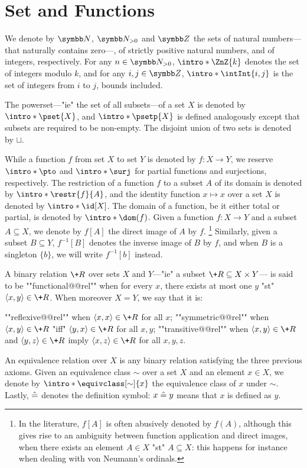\section{Set and Functions}

We denote by $\N$, $\Np$ and $\Z$ the sets of natural numbers---that naturally contains zero---,
of strictly positive natural numbers, and of integers, respectively.
For any $n\in\Np$, \AP$\intro*\ZnZ{k}$ denotes the set of integers modulo $k$,
and for any $i,j \in \Z$, $\intro*\intInt{i,j}$ is the set of integers from $i$ to $j$,
bounds included.

The powerset---"ie" the set of all subsets---of a set $X$
is denoted by $\intro*\pset{X}$, and $\intro*\psetp{X}$ is defined analogously
except that subsets are required to be non-empty.
The disjoint union of two sets is denoted by $\sqcup$.

While a function $f$ from set $X$ to set $Y$ is denoted by $f\colon X \to Y$,
we reserve $\intro*\pto$ and $\intro*\surj$ for partial functions and surjections, respectively.
The restriction of a function $f$ to a subset $A$ of its domain is denoted by
$\intro*\restr{f}{A}$, and the identity function $x \mapsto x$ over a set $X$
is denoted by $\intro*\id[X]$.
The domain of a function, be it either total or partial, is denoted
by \AP$\intro*\dom(f)$.
Given a function $f\colon X \to Y$ and a subset $A \subseteq X$,
we denote by $f[A]$ the direct image of $A$ by $f$.%
\footnote{In the literature, $f[A]$ is often abusively denoted by $f(A)$, although
this gives rise to an ambiguity between function application and direct images,
when there exists an element $A \in X$ "st" $A \subseteq X$: this happens for instance
when dealing with von Neumann's ordinals.}
Similarly, given a subset $B \subseteq Y$, $f^{-1}[B]$ denotes
the inverse image of $B$ by $f$, and when $B$ is a singleton $\{b\}$,
we will write $f^{-1}[b]$ instead.%

A binary relation $\+R$ over sets $X$ and $Y$---"ie" a subset $\+R \subseteq X \times Y$---
is said to be \AP""functional@@rel"" when for every $x$, there exists at most one $y$
"st" $\tup{x,y} \in \+R$.
When moreover $X = Y$, we say that it is:
\begin{itemize}
	\itemAP ""reflexive@@rel"" when $\tup{x,x} \in \+R$ for all $x$;
	\itemAP ""symmetric@@rel"" when $\tup{x,y} \in \+R$ "iff" $\tup{y,x} \in \+R$
		for all $x,y$;
	\itemAP ""transitive@@rel"" when $\tup{x,y} \in \+R$ and $\tup{y,z} \in \+R$
		imply $\tup{x,z} \in \+R$
		for all $x,y,z$.
\end{itemize}
An equivalence relation over $X$ is any binary relation satisfying the three previous axioms.
Given an equivalence class $\sim$ over a set $X$ and an element $x \in X$,
we denote by $\intro*\equivclass[\sim]{x}$ the equivalence class of $x$ under $\sim$.
Lastly, $\mathrel{\hat{=}}$ denotes the definition symbol: $x \mathrel{\hat{=}} y$ means that $x$ is defined as $y$.

